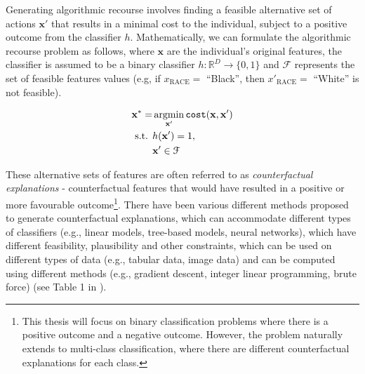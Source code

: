 Generating algorithmic recourse involves finding a feasible alternative set of actions $\mathbf{x}'$ that results in a minimal cost to the individual, subject to a positive outcome from the classifier $h$. Mathematically, we can formulate the algorithmic recourse problem as follows, where $\mathbf{x}$ are the individual's original features, the classifier is assumed to be a binary classifier $h: \mathbb{R}^D \to \{0,1\}$ and $\mathcal{F}$ represents the set of feasible features values (e.g, if $x_{\text{RACE}}=$ ``Black'', then $x'_{\text{RACE}}=$ ``White'' is not feasible).

\begin{align}
	\mathbf{x}^* = & \operatorname*{argmin}_{\mathbf{x}'}  \texttt{cost}(\mathbf{x}, \mathbf{x}') \\ \nonumber
	\text{s.t. } & h(\mathbf{x}') = 1, \\ \nonumber
	& \mathbf{x}' \in \mathcal{F}
\end{align}


These alternative sets of features are often referred to as \textit{counterfactual explanations} - counterfactual features that would have resulted in a positive or more favourable outcome\footnote{This thesis will focus on binary classification problems where there is a positive outcome and a negative outcome. However, the problem naturally extends to multi-class classification, where there are different counterfactual explanations for each class.}. There have been various different methods proposed to generate counterfactual explanations, which can accommodate different types of classifiers (e.g., linear models, tree-based models, neural networks), which have different feasibility, plausibility and other constraints, which can be used on different types of data (e.g., tabular data, image data) and can be computed using different methods (e.g., gradient descent, integer linear programming, brute force) (see Table 1 in \textcite{karimiSurveyAlgorithmicRecourse2022}).\\

